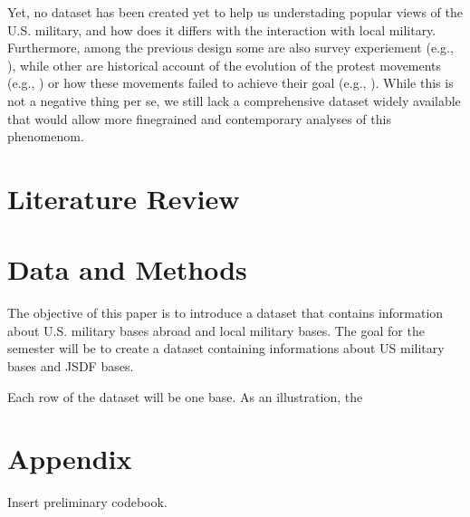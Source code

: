 \documentclass[12pt]{article}
\begin{document}
Yet, no dataset has been created yet to help us understading popular
views of the U.S. military, and how does it differs with the
interaction with local military. Furthermore, among the previous
design some are also survey experiement (e.g., \textcite{horiuchi_tago23}),
while other are historical account of the evolution of the protest
movements (e.g., \textcite{vine19}) or how these movements failed
to achieve their goal (e.g., \parencite{kim17a}). While this is
not a negative thing per se, we still lack a comprehensive dataset
widely available that would allow more finegrained and contemporary
analyses of this phenomenom.


\section{Literature Review}


\section{Data and Methods}

The objective of this paper is to introduce a dataset that contains
information about U.S. military bases abroad and local military
bases. The goal for the semester will be to create a dataset
containing informations about US military bases and JSDF bases.

Each row of the dataset will be one base. As an illustration, the 

\clearpage
\printbibliography
\clearpage

\appendix
\section{Appendix}

Insert preliminary codebook. 
\end{document}
